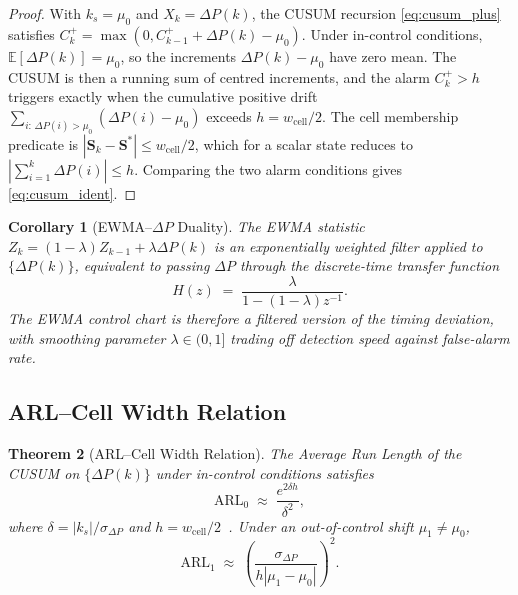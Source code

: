 \documentclass[10pt,twocolumn]{article}
\theoremstyle{plain}
\newtheorem{theorem}{Theorem}[section]
\newtheorem{corollary}[theorem]{Corollary}
\theoremstyle{definition}
\theoremstyle{remark}
\newcommand{\DeltaP}{\Delta P}
\newcommand{\Sstar}{\mathbf{S}^{*}}
\begin{document}
\begin{proof}
With $k_s = \mu_0$ and $X_k = \DeltaP(k)$, the CUSUM recursion
\eqref{eq:cusum_plus} satisfies
$C_k^+ = \max(0, C_{k-1}^+ + \DeltaP(k) - \mu_0)$.
Under in-control conditions, $\mathbb{E}[\DeltaP(k)] = \mu_0$, so the
increments $\DeltaP(k) - \mu_0$ have zero mean.  The CUSUM is then a
running sum of centred increments, and the alarm $C_k^+ > h$ triggers
exactly when the cumulative positive drift $\sum_{i:\,\DeltaP(i)>\mu_0}
(\DeltaP(i)-\mu_0)$ exceeds $h = w_{\mathrm{cell}}/2$.  The
cell membership predicate is
$|\mathbf{S}_k - \Sstar| \leq w_{\mathrm{cell}}/2$, which for a
scalar state reduces to $|\sum_{i=1}^k \DeltaP(i)| \leq h$.
Comparing the two alarm conditions gives \eqref{eq:cusum_ident}.
\end{proof}

\begin{corollary}[EWMA--$\DeltaP$ Duality]
\label{cor:ewma}
The EWMA statistic $Z_k = (1-\lambda)Z_{k-1} + \lambda\DeltaP(k)$
is an exponentially weighted filter applied to $\{\DeltaP(k)\}$,
equivalent to passing $\DeltaP$ through the discrete-time transfer
function
\begin{equation}
  H(z) \;=\; \frac{\lambda}{1-(1-\lambda)z^{-1}}.
  \label{eq:ewma}
\end{equation}
The EWMA control chart is therefore a filtered version of the timing
deviation, with smoothing parameter $\lambda \in (0,1]$ trading off
detection speed against false-alarm rate.
\end{corollary}

\subsection{ARL--Cell Width Relation}
\label{ssec:arl}

\begin{theorem}[ARL--Cell Width Relation]
\label{thm:arl}
The Average Run Length of the CUSUM on $\{\DeltaP(k)\}$ under
in-control conditions satisfies
\begin{equation}
  \mathrm{ARL}_0 \;\approx\; \frac{e^{2\delta h}}{\delta^2},
  \label{eq:arl0}
\end{equation}
where $\delta = |k_s|/\sigma_{\DeltaP}$ and
$h = w_{\mathrm{cell}}/2$~\cite{Lucas1982}.  Under an out-of-control
shift $\mu_1 \neq \mu_0$,
\begin{equation}
  \mathrm{ARL}_1 \;\approx\;
  \left(\frac{\sigma_{\DeltaP}}{h|\mu_1 - \mu_0|}\right)^{\!2}.
  \label{eq:arl1}
\end{equation}
\end{theorem}
\end{document}
